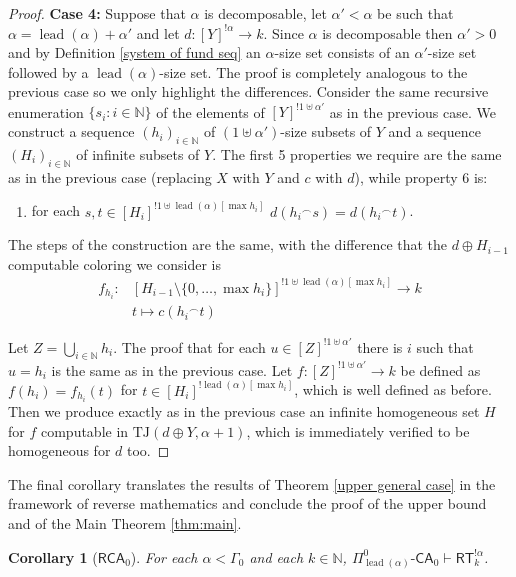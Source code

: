 \documentclass[11pt]{amsart}
\newtheorem{corollary}[thm]{Corollary}
\theoremstyle{definition}
\theoremstyle{remark}
\theoremstyle{plain}
\newcommand{\numberset}{\mathbb}
\newcommand{\N}{\numberset{N}}
\def\a{\alpha}
\def\conc{{}^\smallfrown}
\newcommand{\RCA}{\mathsf{RCA}_0}
\newcommand{\RT}{\mathsf{RT}}
\newcommand{\TJ}{\mathsf{TJ}}
\newcommand{\lead}{\operatorname{lead}}
\newcommand{\CA}{\mathsf{\text{-}CA}_0}
\def\TJ{{\textrm{TJ}}}
\def\N{{\mathbb{N}}}
\begin{document}
\begin{proof}
\medskip

\textbf{Case 4:} Suppose that $\alpha$ is decomposable, let $\a' < \a$ be such that $\alpha = \lead(\alpha) + \a'$ and let $d \colon [Y]^{! \alpha} \to k$.
Since $\alpha$ is decomposable then $\alpha' > 0$ and by Definition \ref{system of fund seq} an $\alpha$-size set consists of an $\alpha'$-size set followed by a $\lead(\alpha)$-size set.
The proof is completely analogous to the previous case so we only highlight the differences.
Consider the same recursive enumeration $\{s_i: i \in \N\}$ of the elements of $[Y]^{!1 \uplus \alpha'}$ as in the previous case.
We construct a sequence $(h_i)_{i \in \N}$ of $(1 \uplus \alpha')$-size subsets of $Y$ and a sequence $(H_i)_{i \in \N}$ of infinite subsets of $Y$.
The first 5 properties we require are the same as in the previous case (replacing $X$ with $Y$ and $c$ with $d$), while property 6 is:
\begin{enumerate}[start=6]
    \item for each $s,t \in [H_i]^{!1 \uplus \lead(\alpha)[\max h_i]}$ $d(h_i \conc s) = d(h_i \conc t)$.
\end{enumerate}

The steps of the construction are the same, with the difference that the $d \oplus H_{i-1}$ computable coloring we consider is
\begin{align*}
    f_{h_i} \colon & [H_{i-1} \setminus \{0, \ldots, \max h_i\}]^{! 1 \uplus \lead(\alpha)[\max h_i]} \to k \\
     & t \mapsto c(h_i \conc t)
\end{align*}

Let $Z = \bigcup_{i \in \N} h_i$.
The proof that for each $u \in [Z]^{! 1 \uplus \alpha'}$ there is $i$ such that $u = h_i$ is the same as in the previous case.
Let $f \colon [Z]^{! 1 \uplus \alpha'} \to k$ be defined as $f(h_i) = f_{h_i} (t)$ for $t \in [H_i]^{! \lead(\alpha)[\max h_i]}$, which is well defined as before.
Then we produce exactly as in the previous case an infinite homogeneous set $H$ for $f$ computable in $\TJ(d \oplus Y, \a+1)$, which is immediately verified to be homogeneous for $d$ too.
\end{proof}

The final corollary translates the results of Theorem \ref{upper general case} in the framework of reverse mathematics and conclude the proof of the upper bound and of the Main Theorem \ref{thm:main}.

\begin{corollary}[$\RCA$]
For each $\alpha < \Gamma_0$ and each $k \in \N$, $\Pi^0_{\lead(\alpha)} \CA \vdash \RT^{! \alpha}_k$.
\end{corollary}
\end{document}
